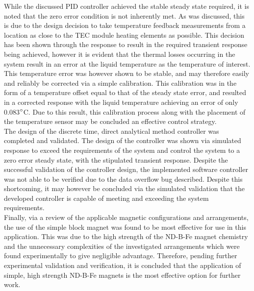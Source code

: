 While the discussed PID controller achieved the stable steady state required, it is noted that the zero error condition is not inherently met. As was discussed, this is due to the design decision to take temperature feedback measurements from a location as close to the TEC module heating elements as possible. This decision has been shown through the response to result in the required transient response being achieved, however it is evident that the thermal losses occurring in the system result in an error at the liquid temperature as the temperature of interest. This temperature error was however shown to be stable, and may therefore easily and reliably be corrected via a simple calibration. This calibration was in the form of a temperature offset equal to that of the steady state error, and resulted in a corrected response with the liquid temperature achieving an error of only 0.083$\degree$C. Due to this result, this calibration process along with the placement of the temperature sensor may be concluded an effective control strategy.\\

The design of the discrete time, direct analytical method controller was completed and validated. The design of the controller was shown via simulated response to exceed the requirements of the system and control the system to a zero error steady state, with the stipulated transient response. Despite the successful validation of the controller design, the implemented software controller was not able to be verified due to the data overflow bug described. Despite this shortcoming, it may however be concluded via the simulated validation that the developed controller is capable of meeting and exceeding the system requirements.\\

Finally, via a review of the applicable magnetic configurations and arrangements, the use of the simple block magnet was found to be most effective for use in this application. This was due to the high strength of the ND-B-Fe magnet chemistry and the unnecessary complexities of the investigated arrangements which were found experimentally to give negligible advantage. Therefore, pending further experimental validation and verification, it is concluded that the application of simple, high strength ND-B-Fe magnets is the most effective option for further work.\\